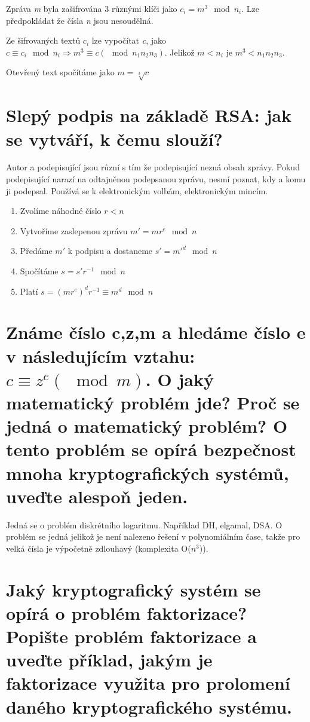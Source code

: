 Zpráva \textit{m} byla zašifrována 3 různými klíči jako $c_i = m^3 \mod n_i$. Lze předpokládat že čísla \textit{n} jsou nesoudělná.

Ze šifrovaných textů $c_i$ lze vypočítat \textit{c}, jako $c \equiv c_i \mod n_i \Rightarrow m^3 \equiv c(\mod n_1n_2n_3)$. Jelikož $m < n_i$ je $m^3 < n_1n_2n_3$.

Otevřený text spočítáme jako $m = \sqrt[3]{c}$

\section{Slepý podpis na základě RSA: jak se vytváří, k čemu slouží?}

Autor a podepisující jsou různí s tím že podepisující nezná obsah zprávy. Pokud podepisující narazí na odtajněnou podepsanou zprávu, nesmí poznat, kdy a komu ji podepsal. Používá se k elektronickým volbám, elektronickým mincím. 

\begin{enumerate}
    \item Zvolíme náhodné číslo $r < n$
    \item Vytvoříme zaslepenou zprávu $m' = mr^e \mod n$
    \item Předáme $m'$ k podpisu a dostaneme $s' = m'^d \mod n$
    \item Spočítáme $s = s'r^{-1} \mod n$
    \item Platí $s = (mr^e)^dr^{-1}\equiv m^d \mod n$
\end{enumerate}

\section{Známe číslo c,z,m a hledáme číslo e v následujícím vztahu: \(c\equiv z^e (\mod m)\). O jaký matematický problém jde? Proč se jedná o matematický problém? O tento problém se opírá bezpečnost mnoha kryptografických systémů, uveďte alespoň jeden.}

Jedná se o problém diskrétního logaritmu. Například DH, elgamal, DSA. O problém se jedná jelikož je není nalezeno řešení v polynomiálním čase, takže pro velká čísla je výpočetně zdlouhavý (komplexita O($n^3$)).

\section{Jaký kryptografický systém se opírá o problém faktorizace? Popište problém faktorizace a uveďte příklad, jakým je faktorizace využita pro prolomení daného kryptografického systému.}

